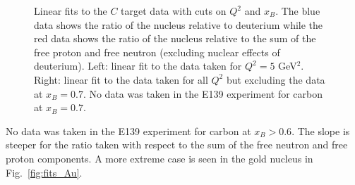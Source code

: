 \documentclass[oneside]{article}
\begin{document}
\begin{figure}
\begin{minipage}{0.5\textwidth}
\end{minipage}
  \caption[]{Linear fits to the $C$ target data with cuts on $Q^2$ and $x_B$. The blue data shows the ratio of the nucleus relative to deuterium while the red data shows the ratio of the nucleus relative to the sum of the free proton and free neutron (excluding nuclear effects of deuterium). Left: linear fit to the data taken for $Q^2=5$ GeV$^2$. Right: linear fit to the data taken for all $Q^2$ but excluding the data at $x_B=0.7$. No data was taken in the E139 experiment for carbon at $x_B=0.7$.}
  \label{fig:fits_C}
\end{figure}   

No data was taken in the E139 experiment for carbon at $x_B>0.6$. The slope is steeper for the ratio taken with respect to the sum of the free neutron and free proton components. A more extreme case is seen in the gold nucleus in Fig.~\ref{fig:fits_Au}. 
\end{document}
